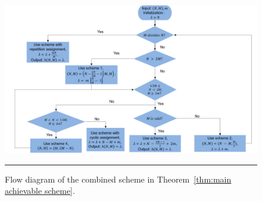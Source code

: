 \documentclass[conference,letterpaper]{IEEEtran}
\begin{document}
\begin{figure}%
\centerline{\includegraphics[scale=0.3]{scheme}}
\caption{\small Flow diagram of the combined scheme in Theorem~\ref{thm:main achievable scheme}.}
\label{fig:scheme}
\rule{\textwidth}{0.2pt} %
\end{figure}
\end{document}

